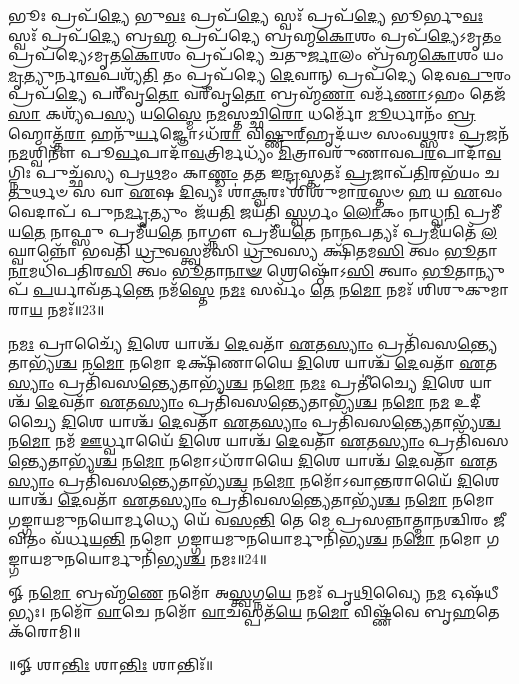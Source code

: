 𑌭𑍂𑌃 𑌪𑍍𑌰𑌪᳴\-\ul{𑌦𑍍𑌯𑍇} 𑌭𑍁\-\ul{𑌵𑌃} 𑌪𑍍𑌰𑌪᳴\-\ul{𑌦𑍍𑌯𑍇} 𑌸𑍍𑌵𑌃᳴ 𑌪𑍍𑌰𑌪᳴\-\ul{𑌦𑍍𑌯𑍇} 𑌭𑍂𑌰𑍍𑌭𑍁\-\ul{𑌵𑌃} 𑌸𑍍𑌵𑌃᳴ 𑌪𑍍𑌰𑌪᳴\-\ul{𑌦𑍍𑌯𑍇} 𑌬𑍍𑌰\-\ul{𑌹𑍍𑌮} 𑌪𑍍𑌰𑌪᳴𑌦𑍍𑌯𑍇 𑌬𑍍𑌰𑌹𑍍𑌮\-\ul{𑌕𑍋}\-𑌶𑌂 𑌪𑍍𑌰𑌪᳴\-\ul{𑌦𑍍𑌯𑍇}\-𑌽𑌮𑍃\-\ul{𑌤𑌂} 𑌪𑍍𑌰𑌪᳴𑌦𑍍𑌯𑍇𑌽𑌮𑍃𑌤\-\ul{𑌕𑍋}\-𑌶𑌂 𑌪𑍍𑌰𑌪᳴𑌦𑍍𑌯𑍇 𑌚𑌤𑍁\-\ul{𑌰𑍍𑌜𑌾}\-𑌲𑌂 𑌬𑍍𑌰᳴𑌹𑍍𑌮\-\ul{𑌕𑍋}\-𑌶𑌂 𑌯𑌂 \ul{𑌮𑍃}\-𑌤𑍍𑌯𑍁𑌰𑍍𑌨𑌾\-\ul{𑌵}\-𑌪𑌶𑍍𑌯᳴\-\ul{𑌤𑌿} 𑌤𑌂 𑌪𑍍𑌰𑌪᳴𑌦𑍍𑌯𑍇 \ul{𑌦𑍇}\-𑌵𑌾𑌨𑍍 𑌪𑍍𑌰𑌪᳴𑌦𑍍𑌯𑍇 𑌦𑍇𑌵\-\ul{𑌪𑍁}\-𑌰𑌂 𑌪𑍍𑌰𑌪᳴\-\ul{𑌦𑍍𑌯𑍇} 𑌪𑌰𑍀᳴𑌵𑍃\-\ul{𑌤𑍋} 𑌵𑌰𑍀᳴𑌵𑍃\-\ul{𑌤𑍋} 𑌬𑍍𑌰𑌹𑍍𑌮᳴\-\ul{𑌣𑌾} 𑌵𑌰𑍍𑌮᳴\-\ul{𑌣𑌾}\-𑌽𑌹𑌂 𑌤𑍇𑌜᳴\-\ul{𑌸𑌾} 𑌕𑌶𑍍𑌯᳴𑌪\-\ul{𑌸𑍍𑌯} 𑌯\-\ul{𑌸𑍍𑌮𑍈} 𑌨\-\ul{𑌮}\-𑌸𑍍𑌤𑌚𑍍𑌛𑌿\-\ul{𑌰𑍋} 𑌧𑌰𑍍𑌮𑍋᳴ \ul{𑌮𑍂}\-𑌰𑍍𑌧𑌾𑌨𑌂᳴ \ul{𑌬𑍍𑌰}\-𑌹𑍍𑌮𑍋𑌤𑍍𑌤᳴\-\ul{𑌰𑌾} 𑌹𑌨𑍁᳴\-\ul{𑌰𑍍𑌯}\-𑌜𑍍𑌞𑍋𑌽𑌧᳴\-\ul{𑌰𑌾} 𑌵𑌿\-\ul{𑌷𑍍𑌣𑍁}\-\-\ul{𑌰𑍍}\-‌𑌹𑍃𑌦᳴𑌯𑍞 𑌸𑌂𑌵\-\ul{𑌥𑍍𑌸}\-𑌰𑌃 \ul{𑌪𑍍𑌰}\-𑌜𑌨᳴𑌨\-\ul{𑌮}\-𑌶𑍍𑌵𑌿𑌨𑍗᳴ 𑌪𑍂\-\ul{𑌰𑍍𑌵}\-𑌪𑌾𑌦𑌾᳴\-\ul{𑌵}\-𑌤𑍍𑌰𑌿𑌰𑍍𑌮𑌧𑍍𑌯𑌂᳴ \ul{𑌮𑌿}\-𑌤𑍍𑌰𑌾𑌵𑌰𑍁᳴𑌣𑌾𑌵𑌪\-\ul{𑌰}\-𑌪𑌾𑌦𑌾᳴\-\ul{𑌵}\-𑌗𑍍𑌨𑌿𑌃 𑌪𑍁𑌚𑍍𑌛᳴𑌸𑍍𑌯 𑌪𑍍𑌰\-\ul{𑌥}\-𑌮𑌂 𑌕𑌾\-\ul{𑌣𑍍𑌡𑌂} 𑌤\-\ul{𑌤} 𑌇\-\ul{𑌨𑍍𑌦𑍍𑌰}\-𑌸𑍍𑌤𑌤𑌃᳴ \ul{𑌪𑍍𑌰}\-𑌜𑌾𑌪᳴\-\ul{𑌤𑌿}\-𑌰𑌭᳴𑌯𑌂 𑌚\-\ul{𑌤𑍁}\-𑌰𑍍𑌥𑍞 𑌸 𑌵𑌾 \ul{𑌏}\-𑌷 \ul{𑌦𑌿}\-𑌵𑍍𑌯𑌃 𑌶𑌾॑\-\ul{𑌕𑍍𑌵}\-𑌰𑌃 𑌶𑌿𑌶𑍁᳴𑌮𑌾\-\ul{𑌰}\-𑌸𑍍𑌤𑍞 \ul{𑌹} 𑌯 \ul{𑌏}\-𑌵𑌂 𑌵𑍇𑌦𑌾𑌪᳴ 𑌪𑍁𑌨\-\ul{𑌰𑍍𑌮𑍃}\-𑌤𑍍𑌯𑍁𑌂 𑌜᳴𑌯\-\ul{𑌤𑌿} 𑌜𑌯᳴𑌤𑌿 \ul{𑌸𑍍𑌵}\-𑌰𑍍𑌗𑌂 \ul{𑌲𑍋}\-𑌕𑌂 𑌨𑌾𑌧𑍍𑌵\-\ul{𑌨𑌿} 𑌪𑍍𑌰𑌮𑍀᳴𑌯\-\ul{𑌤𑍇} 𑌨𑌾𑌫𑍍𑌸𑍁 𑌪𑍍𑌰𑌮𑍀᳴𑌯\-\ul{𑌤𑍇} 𑌨𑌾𑌗𑍍𑌨𑍗 𑌪𑍍𑌰𑌮𑍀᳴𑌯\-\ul{𑌤𑍇} 𑌨𑌾\-\ul{𑌨}\-𑌪𑌤𑍍𑌯𑌃᳴ 𑌪𑍍𑌰\-\ul{𑌮𑍀}\-𑌯𑌤𑍇᳴ \ul{𑌲}\-𑌘𑍍𑌵𑌾𑌨𑍍𑌨𑍋᳴ 𑌭𑌵𑌤𑌿 \ul{𑌧𑍍𑌰𑍁}\-𑌵𑌸𑍍𑌤𑍍𑌵𑌮᳴𑌸𑌿 \ul{𑌧𑍍𑌰𑍁}\-𑌵𑌸𑍍𑌯 𑌕𑍍𑌷𑌿᳴𑌤𑌮\-\ul{𑌸𑌿} 𑌤𑍍𑌵𑌂 \ul{𑌭𑍂}\-𑌤𑌾\-\ul{𑌨𑌾}\-𑌮𑌧𑌿᳴𑌪𑌤𑌿𑌰\-\ul{𑌸𑌿} 𑌤𑍍𑌵𑌂 \ul{𑌭𑍂}\-𑌤𑌾\-\ul{𑌨𑌾}\-\-\ul{𑍟} 𑌶𑍍𑌰𑍇𑌷𑍍𑌠𑍋᳴𑌽\-\ul{𑌸𑌿} 𑌤𑍍𑌵𑌾𑌂 \ul{𑌭𑍂}\-𑌤𑌾𑌨𑍍𑌯𑍁𑌪᳴ \ul{𑌪}\-𑌰𑍍𑌯𑌾𑌵᳴𑌰𑍍𑌤\-\ul{𑌨𑍍𑌤𑍇} 𑌨𑌮᳴\-\ul{𑌸𑍍𑌤𑍇} 𑌨\-\ul{𑌮𑌃} 𑌸𑌰𑍍𑌵𑌂᳴ \ul{𑌤𑍇} 𑌨\-\ul{𑌮𑍋} 𑌨𑌮𑌃᳴ 𑌶𑌿𑌶𑍁𑌕𑍁𑌮𑌾𑌰𑌾\-\ul{𑌯} 𑌨𑌮𑌃᳴॥23॥
\anuvakamend

𑌨\-\ul{𑌮𑌃} 𑌪𑍍𑌰𑌾𑌚𑍍𑌯𑍈᳴ \ul{𑌦𑌿}\-𑌶𑍇 𑌯𑌾𑌶𑍍𑌚᳴ \ul{𑌦𑍇}\-𑌵𑌤𑌾᳴ \ul{𑌏}\-𑌤\-\ul{𑌸𑍍𑌯𑌾𑌂} 𑌪𑍍𑌰𑌤𑌿᳴𑌵𑌸\-\ul{𑌨𑍍𑌤𑍍𑌯𑍇}\-𑌤𑌾𑌭𑍍𑌯᳴\-\ul{𑌶𑍍𑌚}  𑌨\-\ul{𑌮𑍋} 𑌨𑌮𑍋 𑌦𑌕𑍍𑌷𑌿᳴𑌣𑌾𑌯𑍈 \ul{𑌦𑌿}\-𑌶𑍇 𑌯𑌾𑌶𑍍𑌚᳴ \ul{𑌦𑍇}\-𑌵𑌤𑌾᳴ \ul{𑌏}\-𑌤\-\ul{𑌸𑍍𑌯𑌾𑌂} 𑌪𑍍𑌰𑌤𑌿᳴𑌵𑌸\-\ul{𑌨𑍍𑌤𑍍𑌯𑍇}\-𑌤𑌾𑌭𑍍𑌯᳴\-\ul{𑌶𑍍𑌚}  𑌨\-\ul{𑌮𑍋} 𑌨\-\ul{𑌮𑌃} 𑌪𑍍𑌰𑌤𑍀॑𑌚𑍍𑌯𑍈 \ul{𑌦𑌿}\-𑌶𑍇 𑌯𑌾𑌶𑍍𑌚᳴ \ul{𑌦𑍇}\-𑌵𑌤𑌾᳴ \ul{𑌏}\-𑌤\-\ul{𑌸𑍍𑌯𑌾𑌂} 𑌪𑍍𑌰𑌤𑌿᳴𑌵𑌸\-\ul{𑌨𑍍𑌤𑍍𑌯𑍇}\-𑌤𑌾𑌭𑍍𑌯᳴\-\ul{𑌶𑍍𑌚}  𑌨\-\ul{𑌮𑍋} 𑌨\-\ul{𑌮} 𑌉𑌦𑍀॑𑌚𑍍𑌯𑍈 \ul{𑌦𑌿}\-𑌶𑍇 𑌯𑌾𑌶𑍍𑌚᳴ \ul{𑌦𑍇}\-𑌵𑌤𑌾᳴ \ul{𑌏}\-𑌤\-\ul{𑌸𑍍𑌯𑌾𑌂} 𑌪𑍍𑌰𑌤𑌿᳴𑌵𑌸\-\ul{𑌨𑍍𑌤𑍍𑌯𑍇}\-𑌤𑌾𑌭𑍍𑌯᳴\-\ul{𑌶𑍍𑌚}  𑌨\-\ul{𑌮𑍋} 𑌨𑌮᳴ \ul{𑌊}\-𑌰𑍍𑌧𑍍𑌵𑌾𑌯𑍈᳴ \ul{𑌦𑌿}\-𑌶𑍇 𑌯𑌾𑌶𑍍𑌚᳴ \ul{𑌦𑍇}\-𑌵𑌤𑌾᳴ \ul{𑌏}\-𑌤\-\ul{𑌸𑍍𑌯𑌾𑌂} 𑌪𑍍𑌰𑌤𑌿᳴𑌵𑌸\-\ul{𑌨𑍍𑌤𑍍𑌯𑍇}\-𑌤𑌾𑌭𑍍𑌯᳴\-\ul{𑌶𑍍𑌚}  𑌨\-\ul{𑌮𑍋} 𑌨𑌮𑍋𑌽𑌧᳴𑌰𑌾𑌯𑍈 \ul{𑌦𑌿}\-𑌶𑍇 𑌯𑌾𑌶𑍍𑌚᳴ \ul{𑌦𑍇}\-𑌵𑌤𑌾᳴ \ul{𑌏}\-𑌤\-\ul{𑌸𑍍𑌯𑌾𑌂} 𑌪𑍍𑌰𑌤𑌿᳴𑌵𑌸\-\ul{𑌨𑍍𑌤𑍍𑌯𑍇}\-𑌤𑌾𑌭𑍍𑌯᳴\-\ul{𑌶𑍍𑌚}  𑌨\-\ul{𑌮𑍋} 𑌨𑌮𑍋᳴𑌽𑌵𑌾\-\ul{𑌨𑍍𑌤}\-𑌰𑌾𑌯𑍈᳴ \ul{𑌦𑌿}\-𑌶𑍇 𑌯𑌾𑌶𑍍𑌚᳴ \ul{𑌦𑍇}\-𑌵𑌤𑌾᳴ \ul{𑌏}\-𑌤\-\ul{𑌸𑍍𑌯𑌾𑌂} 𑌪𑍍𑌰𑌤𑌿᳴𑌵𑌸\-\ul{𑌨𑍍𑌤𑍍𑌯𑍇}\-𑌤𑌾𑌭𑍍𑌯᳴\-\ul{𑌶𑍍𑌚}  𑌨\-\ul{𑌮𑍋} 𑌨𑌮𑍋 𑌗𑌙𑍍𑌗𑌾𑌯𑌮𑍁𑌨𑌯𑍋𑌰𑍍𑌮𑌧𑍍𑌯𑍇 𑌯𑍇᳴ 𑌵\-\ul{𑌸}\-\-\ul{𑌨𑍍𑌤𑌿} 𑌤𑍇 𑌮𑍇 𑌪𑍍𑌰𑌸𑌨𑍍𑌨𑌾𑌤𑍍𑌮𑌾𑌨𑌶𑍍𑌚𑌿𑌰𑌂 𑌜𑍀𑌵𑌿𑌤𑌂 𑌵᳴𑌰𑍍𑌧\-\ul{𑌯}\-\-\ul{𑌨𑍍𑌤𑌿} 𑌨𑌮𑍋 𑌗𑌙𑍍𑌗𑌾𑌯𑌮𑍁𑌨𑌯𑍋𑌰𑍍𑌮𑍁𑌨𑌿᳴𑌭𑍍𑌯\-\ul{𑌶𑍍𑌚} 𑌨\-\ul{𑌮𑍋} 𑌨𑌮𑍋 𑌗𑌙𑍍𑌗𑌾𑌯𑌮𑍁𑌨𑌯𑍋𑌰𑍍𑌮𑍁𑌨𑌿᳴𑌭𑍍𑌯\-\ul{𑌶𑍍𑌚} 𑌨𑌮𑌃॥24॥
\anuvakamend

𑍐 𑌨\-\ul{𑌮𑍋} 𑌬𑍍𑌰𑌹𑍍𑌮᳴\-\ul{𑌣𑍇} 𑌨𑌮𑍋᳴ 𑌅\-\ul{𑌸𑍍𑌤𑍍𑌵}\-𑌗𑍍𑌨\-\ul{𑌯𑍇} 𑌨𑌮𑌃᳴ 𑌪𑍃\-\ul{𑌥𑌿}\-𑌵𑍍𑌯𑍈 𑌨\-\ul{𑌮} 𑌓𑌷᳴𑌧𑍀𑌭𑍍𑌯𑌃। 
𑌨𑌮𑍋᳴ \ul{𑌵𑌾}\-𑌚𑍇 𑌨𑌮𑍋᳴ \ul{𑌵𑌾}\-𑌚𑌸𑍍𑌪𑌤᳴\-\ul{𑌯𑍇} 𑌨\-\ul{𑌮𑍋} 𑌵𑌿𑌷𑍍𑌣᳴𑌵𑍇 𑌬𑍃\-\ul{𑌹}\-𑌤𑍇 𑌕᳴𑌰𑍋𑌮𑌿॥\\
\centerline{॥𑍐 𑌶𑌾\-\ul{𑌨𑍍𑌤𑌿𑌃} 𑌶𑌾\-\ul{𑌨𑍍𑌤𑌿𑌃} 𑌶𑌾𑌨𑍍𑌤𑌿𑌃᳴॥}
